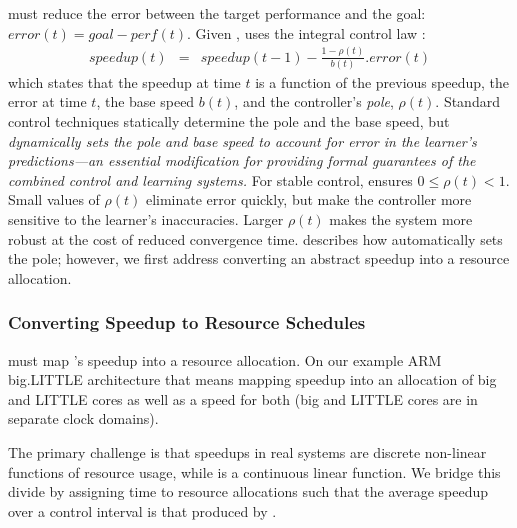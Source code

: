 \SYSTEM{} must reduce the error between the target performance and the goal: $ error(t) = goal - perf(t)$.
Given , \SYSTEM{} uses the integral control law
\cite{Hellerstein2004a}:
\begin{eqnarray}
  speedup(t) &=& speedup(t-1) - \frac{1 - \rho(t)}{b(t)}.error(t)
  \label{eqn:speedup-control}
\end{eqnarray}
which states that the speedup at time $t$ is a function of the
previous speedup, the error at time $t$, the base speed $b(t)$, and
the controller's \emph{pole}, $\rho(t)$.  Standard control techniques
statically determine the pole and the base speed, but \SYSTEM{}
\emph{dynamically sets the pole and base speed to account for error in
  the learner's predictions---an essential modification for providing
  formal guarantees of the combined control and learning systems.}
For stable control, \SYSTEM{} ensures $0 \le \rho(t) < 1$. Small
values of $\rho(t)$ eliminate error quickly, but make the controller
more sensitive to the learner's inaccuracies.  Larger $\rho(t)$ makes
the system more robust at the cost of reduced convergence time.
 describes how \SYSTEM{} automatically sets the
pole; however, we first address converting an abstract speedup into a
resource allocation.

\subsubsection{Converting Speedup to Resource Schedules}
\SYSTEM{} must map 's speedup into a resource
allocation.  On our example ARM big.LITTLE architecture that means
mapping speedup into an allocation of big and LITTLE cores as well as
a speed for both (big and LITTLE cores are in separate clock domains).

The primary challenge is that speedups in real systems are discrete
non-linear functions of resource usage, while 
is a continuous linear function.  We bridge this divide by assigning
time to resource allocations such that the average speedup over a
control interval is that produced by .

